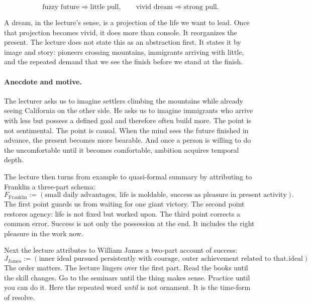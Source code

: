 \begin{equation}
\text{fuzzy future} \Rightarrow \text{little pull}, \qquad
\text{vivid dream} \Rightarrow \text{strong pull}.
\end{equation}

A dream, in the lecture's sense, is a projection of the life we want to lead. Once that projection becomes vivid, it does more than console. It reorganizes the present. The lecture does not state this as an abstraction first. It states it by image and story: pioneers crossing mountains, immigrants arriving with little, and the repeated demand that we see the finish before we stand at the finish.

\paragraph{Anecdote and motive.}
The lecturer asks us to imagine settlers climbing the mountains while already seeing California on the other side. He asks us to imagine immigrants who arrive with less but possess a defined goal and therefore often build more. The point is not sentimental. The point is causal. When the mind sees the future finished in advance, the present becomes more bearable. And once a person is willing to do the uncomfortable until it becomes comfortable, ambition acquires temporal depth.

The lecture then turns from example to quasi-formal summary by attributing to Franklin a three-part schema:
\begin{equation}
F_{\text{Franklin}} := (\text{small daily advantages},\ \text{life is moldable},\ \text{success as pleasure in present activity}).
\end{equation}
The first point guards us from waiting for one giant victory. The second point restores agency: life is not fixed but worked upon. The third point corrects a common error. Success is not only the possession at the end. It includes the right pleasure in the work now.

Next the lecture attributes to William James a two-part account of success:
\begin{equation}
J_{\text{James}} := (\text{inner ideal pursued persistently with courage},\ \text{outer achievement related to that ideal}).
\end{equation}
The order matters. The lecture lingers over the first part. Read the books until the skill changes. Go to the seminars until the thing makes sense. Practice until you can do it. Here the repeated word \emph{until} is not ornament. It is the time-form of resolve.

